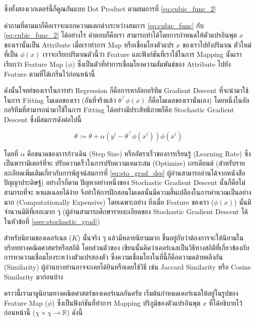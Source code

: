 \noindent ซึ่งทั้งสองเวกเตอร์นี้ก็คูณกันแบบ Dot Product ตามสมการที่ \ref{eq:cubic_func_2}
 
คำถามที่ตามมาก็คือเราจะแยกความแตกต่างระหว่างสมการ \ref{eq:cubic_func} กับ \ref{eq:cubic_func_2} ได้อย่างไร คำตอบก็คือเรา%
สามารถทำได้โดยการกำหนดให้ตัวแปรอินพุต $x$ ของเรานั้นเป็น Attribute เมื่อเราทำการ Map หรือเชื่อมโยงตัวแปร $x$ ของเราไปยังปริมาณ%
ตัวใหม่ที่เป็น $\phi(x)$ เราจะเรียกปริมาณตัวนี้ว่า Feature และฟังก์ชันที่เราใช้ในการ Mapping นั้นเราเรียกว่า Feature Map ($\phi$) 
ซึ่งเป็นตัวที่ทำการเชื่อมโยงความสัมพันธ์ของ Attribute ไปยัง Feature ตามที่ได้เกริ่นไว้ก่อนหน้านี้

ดังนั้นโจทย์ของเราในการทำ Regression ก็คือการหาอัลกอริทึม Gradient Descent ที่จะนำมาใช้ในการ Fitting โมเดลของเรา (อันที่จริงแล้ว
$\theta^{\top}\phi(x)$ ก็คือโมเดลของเรานั่นเอง) โดยหนึ่งในอัลกอริทึมที่สามารถนำมาใช้ในการ Fitting ได้อย่างมีประสิทธิภาพก็คือ 
Stochastic Gradient Descent ซึ่งมีสมการดังต่อไปนี้

\begin{equation}\label{eq:sto_grad_des}
    \theta := \theta + \alpha (y^{i} - \theta^{\top}\phi(x^{i}))\phi(x^{i})
\end{equation}

\noindent โดยที่ $\alpha$ คือขนาดของการก้าวเดิน (Step Size) หรืออัตราเร็วของการเรียนรู้ (Learning Rate) ซึ่งเป็นพารามิเตอร์ที่จะ%
ปรับความเร็วในการปรับความเหมาะสม (Optimize) เกรเดียนต์ (สำหรับรายละเอียดเพิ่มเติมเกี่ยวกับการพิสูจน์สมการที่ \ref{eq:sto_grad_des} 
ผู้อ่านสามารถอ่านได้จากหนังสือปัญญาประดิษฐ์) อย่างไรก็ตาม ปัญหาอย่างหนึ่งของ Stochastic Gradient Descent นั้นก็คือไม่สามารถที่จะ%
หาผลเฉลยได้ง่าย จึงทำให้การฝึกสอนโมเดลนั้นมีความสิ้นเปลืองในการคำนวณเป็นอย่างมาก (Computationally Expensive) โดยเฉพาะอย่าง%
ยิ่งเมื่อ Feature ของเรา ($\phi(x)$) นั้นมีจำนวนมิติที่เยอะมาก ๆ (ผู้อ่านสามารถศึกษารายละเอียดของ Stochastic Gradient Descent 
ได้ในหัวข้อที่ \ref{ssec:stochastic_grad})

สำหรับนิยามของเคอร์เนล ($K$) นั้นจริง ๆ แล้วมีหลายนิยามมาก ขึ้นอยู่กับว่าต้องการจะให้นิยามในบริบททางคณิตศาสตร์หรือสถิติ โดยส่วนตัวของ%
เขียนนั้นคิดว่าเคอร์เนลเป็นวิธีทางสถิติที่เกี่ยวข้องกับการหาความเชื่อมโยงระหว่างตัวแปรสองตัว ซึ่งความเชื่อมโยงในที่นี้ก็คือความคล้ายคลึงกัน 
(Similarity) ผู้อ่านบางท่านอาจจะเคยได้ยินหรือเคยใช้วิธี เช่น Jaccard Similarity หรือ Cosine Similarity มาก่อนบ้าง 

คราวนี้เรามาดูนิยามทางคณิตศาสตร์ของเคอร์เนลกันครับ เริ่มต้นกำหนดเคอร์เนลให้อยู่ในรูปของ Feature Map ($\phi$) ซึ่งเป็นฟังก์ชันที่ทำการ 
Mapping ปริภูมิของตัวแปรอินพุต $x$ ที่ได้อธิบายไว้ก่อนหน้านี้ ($\chi \times \chi \rightarrow \mathbb{R}$) ดังนี้

